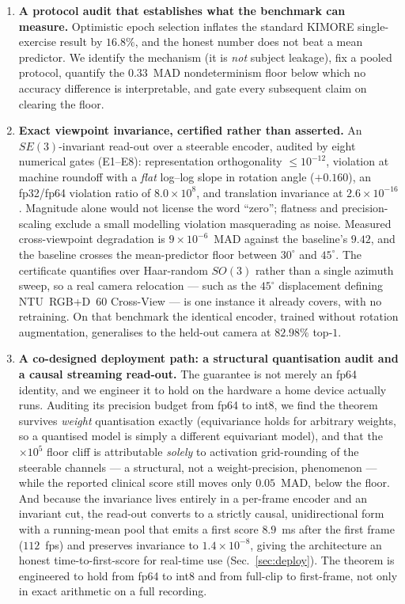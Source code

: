 \documentclass[10pt,journal]{IEEEtran}
\begin{document}
\begin{enumerate}
\item \textbf{A protocol audit that establishes what the benchmark can measure.} Optimistic epoch selection inflates the standard KIMORE single-exercise result by $16.8\%$, and the honest number does not beat a mean predictor. We identify the mechanism (it is \emph{not} subject leakage), fix a pooled protocol, quantify the $0.33$~MAD nondeterminism floor below which no accuracy difference is interpretable, and gate every subsequent claim on clearing the floor.

\item \textbf{Exact viewpoint invariance, certified rather than asserted.} An $SE(3)$-invariant read-out over a steerable encoder, audited by eight numerical gates (E1--E8): representation orthogonality $\le10^{-12}$, violation at machine roundoff with a \emph{flat} log--log slope in rotation angle ($+0.160$), an fp32/fp64 violation ratio of $8.0\times10^{8}$, and translation invariance at $2.6\times10^{-16}$. Magnitude alone would not license the word ``zero''; flatness and precision-scaling exclude a small modelling violation masquerading as noise. Measured cross-viewpoint degradation is $9\times10^{-6}$~MAD against the baseline's $9.42$, and the baseline crosses the mean-predictor floor between $30^\circ$ and $45^\circ$. The certificate quantifies over Haar-random $SO(3)$ rather than a single azimuth sweep, so a real camera relocation --- such as the $45^\circ$ displacement defining NTU~RGB+D~$60$ Cross-View --- is one instance it already covers, with no retraining. On that benchmark the identical encoder, trained without rotation augmentation, generalises to the held-out camera at $82.98\%$ top-$1$.

\item \textbf{A co-designed deployment path: a structural quantisation audit and a causal streaming read-out.} The guarantee is not merely an fp64 identity, and we engineer it to hold on the hardware a home device actually runs. Auditing its precision budget from fp64 to int8, we find the theorem survives \emph{weight} quantisation exactly (equivariance holds for arbitrary weights, so a quantised model is simply a different equivariant model), and that the $\times10^{5}$ floor cliff is attributable \emph{solely} to activation grid-rounding of the steerable channels --- a structural, not a weight-precision, phenomenon --- while the reported clinical score still moves only $0.05$~MAD, below the floor. And because the invariance lives entirely in a per-frame encoder and an invariant cut, the read-out converts to a strictly causal, unidirectional form with a running-mean pool that emits a first score $8.9$~ms after the first frame ($112$~fps) and preserves invariance to $1.4\times10^{-8}$, giving the architecture an honest time-to-first-score for real-time use (Sec.~\ref{sec:deploy}). The theorem is engineered to hold from fp64 to int8 and from full-clip to first-frame, not only in exact arithmetic on a full recording.


\end{enumerate}
\end{document}
